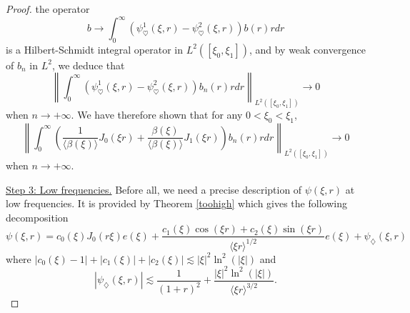 \documentclass[11 pt]{amsart}
\theoremstyle{definition}
\theoremstyle{remark}
\numberwithin{equation}{section}
\begin{document}
\begin{proof}
the operator
\[ b \rightarrow \int_0^\infty (\psi_{\heartsuit}^1 (\xi, r) -
   \psi_{\heartsuit}^2 (\xi, r)) b (r) r d r \]
is a Hilbert-Schmidt integral operator in $L^2 ([\xi_0, \xi_1])$, and by weak convergence
of $b_n$ in $L^2$, we deduce that
\[ \left\| \int_0^\infty (\psi_{\heartsuit}^1 (\xi, r) -
   \psi_{\heartsuit}^2 (\xi, r)) b_n (r) r d r \right\|_{L^2 ([\xi_0, \xi_1])}
   \rightarrow 0 \]
when $n \rightarrow + \infty$. We have therefore shown that for any $0 < \xi_0
< \xi_1$,
\[ \left\| \int_0^\infty \left( \frac{1}{\langle \beta (\xi) \rangle} J_0
   (\xi r) + \frac{\beta (\xi)}{\langle \beta (\xi) \rangle} J_1 (\xi r)
   \right) b_n (r) r d r \right\|_{L^2 ([\xi_0, \xi_1])} \rightarrow 0 \]
when $n \rightarrow + \infty.$
\medskip

\noindent \underline{Step 3: Low frequencies.} 
Before all, we need a precise description of $\psi(\xi,r)$ at low frequencies. It is provided by Theorem \ref{toohigh} which gives the following decomposition
\[ \psi (\xi, r) = c_0(\xi) J_0 (r \xi) e (\xi) + \frac{c_1 (\xi) \cos (\xi r) + c_2 (\xi) \sin
     (\xi r)}{\langle \xi r \rangle^{1 / 2}} e (\xi) + \psi_{\diamondsuit} (\xi, r) \]
where $|c_0(\xi) - 1| + | c_1 (\xi) | + | c_2 (\xi) | \lesssim | \xi |^2 \ln^2 (| \xi |)$ and
$$
\left| \psi_\diamondsuit (\xi, r) \right| \lesssim \frac{1}{(1 + r)^2} + \frac{| \xi |^2 \ln^2 (| \xi |)}{\langle \xi r \rangle^{3 / 2}}.
$$


\end{proof}
\end{document}
